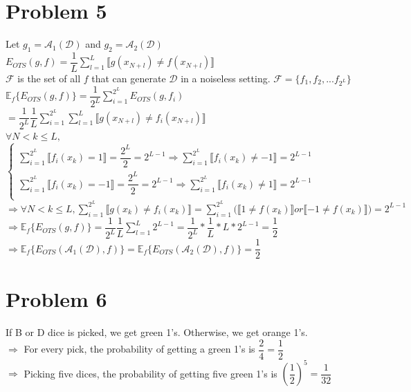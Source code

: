 \documentclass[12pt, a4paper]{article}
\begin{document}
\begin{CJK}{UTF8}{bkai}
	\section*{Problem 5}
		Let $g_1 = \mathcal{A}_1(\mathcal{D})$ and $g_2 = \mathcal{A}_2(\mathcal{D})$ \\
		$E_{OTS}(g,f) = \dfrac{1}{L} \sum\limits_{l=1}^{L} \llbracket g(x_{N+l}) \neq f(x_{N+l})\rrbracket$  \\
		$\mathcal{F}$ is the set of all $f$ that can generate $\mathcal{D}$ in a noiseless setting. $\mathcal{F} = \{f_1,f_2,...f_{2^L}\}$ \\
		$\mathbb{E}_f\Big\{E_{OTS}(g,f)\Big\} = \dfrac{1}{2^L}\sum\limits_{i=1}^{2^L} E_{OTS}(g,f_i)$
		$=\dfrac{1}{2^L}\dfrac{1}{L}\sum\limits_{i=1}^{2^L}\sum\limits_{l=1}^{L} \llbracket g(x_{N+l}) \neq f_i(x_{N+l})\rrbracket$ \\
		$\forall N < k \leq L,$
		$\begin{cases}
			\sum\limits_{i=1}^{2^L}\llbracket f_i(x_k) = 1 \rrbracket = \dfrac{2^{L}}{2} = 2^{L-1}
			\Rightarrow \sum\limits_{i=1}^{2^L}\llbracket f_i(x_k) \neq -1 \rrbracket = 2^{L-1} \\
			\sum\limits_{i=1}^{2^L}\llbracket f_i(x_k) = -1 \rrbracket = \dfrac{2^{L}}{2} = 2^{L-1}
			\Rightarrow \sum\limits_{i=1}^{2^L}\llbracket f_i(x_k) \neq 1 \rrbracket = 2^{L-1} \\
		\end{cases}$ \\
		$\Rightarrow \forall N<k\leq L,\sum\limits_{i=1}^{2^L}\llbracket g(x_k) \neq f_i(x_k)\rrbracket = \sum\limits_{i=1}^{2^L}\Big(\llbracket 1 \neq f(x_k)\rrbracket or \llbracket -1 \neq f(x_k)\rrbracket \Big) = 2^{L-1}$ \\
		$\Rightarrow \mathbb{E}_f\Big\{E_{OTS}(g,f)\Big\} = \dfrac{1}{2^L}\dfrac{1}{L} \sum\limits_{l=1}^{L} 2^{L-1} = \dfrac{1}{2^L}*\dfrac{1}{L}*L*2^{L-1} = \dfrac{1}{2}$ \\
		$\Rightarrow \mathbb{E}_f\Big\{E_{OTS}(\mathcal{A}_1(\mathcal{D}),f)\Big\} = \mathbb{E}_f\Big\{E_{OTS}(\mathcal{A}_2(\mathcal{D}),f)\Big\} = \dfrac{1}{2}$ 

	\section*{Problem 6}
		If B or D dice is picked, we get green 1’s. Otherwise, we get orange 1's. \\
		$\Rightarrow$ For every pick, the probability of getting a green 1's is $\dfrac{2}{4} = \dfrac{1}{2}$\\
		$\Rightarrow$ Picking five dices, the probability of getting five green 1's is $(\dfrac{1}{2})^5 = \dfrac{1}{32}$
	

\end{CJK}
\end{document}
